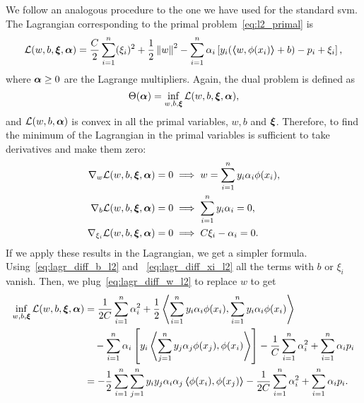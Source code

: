 %
We follow an analogous procedure to the one we have used for the standard \acrshort{svm}. The Lagrangian corresponding to the primal problem~\eqref{eq:l2_primal} is 
\begin{equation}
    \label{eq:l2_lagr}
    \lagr(w, b, \fv{\xi}, \fv{\alpha}) = \frac{C}{2} \sum_{i=1}^\nsamples (\xi_i)^2 + \frac{1}{2} \norm{w}^2 - \sum_{i=1}^\nsamples \alpha_i \left[ y_i (\dotp{w}{\phi(x_i)} + b) - p_i + \xi_i \right] ,
\end{equation}
%
where $\bm{\alpha} \geq 0$ are the Lagrange multipliers.
%
Again, the dual problem is defined as 
$$ \Theta(\bm{\alpha}) = \inf_{w, b, \bm{\xi}} \mathcal{L}(w, b, \bm{\xi}, \bm{\alpha}) , $$
and $\mathcal{L}(w, b, \bm{\alpha})$ is convex in all the primal variables, $w, b$ and $\bm{\xi}$. Therefore, to find the minimum of the Lagrangian in the primal variables is sufficient to take derivatives and make them zero:
\begin{align}
    \nabla_w \lagr(w, b, \fv{\xi}, \fv{\alpha}) = 0 &\implies w = \sum_{i=1}^\nsamples y_i \alpha_i \phi(x_i) , \label{eq:lagr_diff_w_l2} \\
    \nabla_b \lagr(w, b, \fv{\xi}, \fv{\alpha}) = 0 &\implies \sum_{i=1}^\nsamples y_i \alpha_i = 0, \label{eq:lagr_diff_b_l2} \\
    \nabla_{\xi_i} \lagr(w, b, \fv{\xi}, \fv{\alpha}) = 0 &\implies C \xi_i - \alpha_i  = 0 . \label{eq:lagr_diff_xi_l2}
\end{align}
If we apply these results in the Lagrangian, we get a simpler formula. Using~\eqref{eq:lagr_diff_b_l2} and ~\eqref{eq:lagr_diff_xi_l2} all the terms with $b$ or $\xi_i$ vanish. Then, we plug~\eqref{eq:lagr_diff_w_l2} to replace $w$ to get 
\begin{equation}
    \nonumber
    \begin{aligned}
        \inf_{w, b, \bm{\xi}} \mathcal{L}(w, b, \bm{\xi}, \bm{\alpha}) &= \frac{1}{2C} \sum_{i=1}^n \alpha_i^2 + \frac{1}{2} \bm{\left\langle} \sum_{i=1}^n y_i \alpha_i \phi(x_i), \sum_{i=1}^n y_i \alpha_i \phi(x_i) \bm{\right\rangle} \\
        &\quad- \sum_{i=1}^n \alpha_i \left[y_i \bm{\left\langle} \sum_{j=1}^n y_j \alpha_j \phi(x_j), \phi(x_i) \bm{\right\rangle}  \right] - \frac{1}{C} \sum_{i=1}^n \alpha_i^2 + \sum_{i=1}^n \alpha_i p_i  \\
        &= -\frac{1}{2} \sum_{i=1}^n \sum_{j=1}^n y_i y_j \alpha_i \alpha_j \bm{\left\langle} \phi(x_i), \phi(x_j) \bm{\right\rangle} - \frac{1}{2C} \sum_{i=1}^n \alpha_i^2 + \sum_{i=1}^n \alpha_i p_i .
    \end{aligned}
\end{equation}
